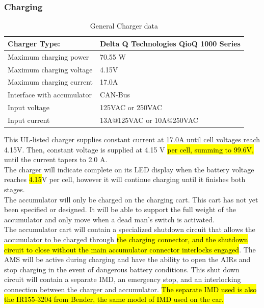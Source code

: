 \documentclass{article}
\DeclareRobustCommand{\hlr}[1]{{\sethlcolor{red}\hl{#1}}}
\begin{document}
        \subsubsection{Charging} \label{charging}


            \begin{table}[H]
            \centering
            \begin{tabular}{|l|l|}
            \hline
            Charger Type: & Delta Q Technologies QioQ 1000 Series \\ \hline
            Maximum charging power & 70.55 W \\ \hline
            Maximum charging voltage & 4.15V \\ \hline
            Maximum charging current & 17.0A \\ \hline
            Interface with accumulator & CAN-Bus \\ \hline
            Input voltage & 125VAC or 250VAC \\ \hline
            Input current & 13A@125VAC or 10A@250VAC \\ \hline
            \end{tabular}
            \caption{General Charger data}
            \label{charger}
            \end{table}

            This UL-listed charger supplies constant current at 17.0A until cell voltages reach 4.15V. Then, constant voltage is supplied at 4.15 V \hlr{per cell, summing to 99.6V,} until the current tapers to 2.0 A.\\

            The charger will indicate complete on its LED display when the battery voltage reaches \hlr{4.15}V per cell, however it will continue charging until it finishes both stages.\\

            The accumulator will only be charged on the charging cart. This cart has not yet been specified or designed. It will be able to support the full weight of the accumulator and only move when a dead man's switch is activated.\\

            The accumulator cart will contain a specialized shutdown circuit that allows the accumulator to be charged through \hlr{the charging connector, and the shutdown circuit to close without the main accumulator connector interlocks engaged}. The AMS will be active during charging and have the ability to open the AIRs and stop charging in the event of dangerous battery conditions. This shut down circuit will contain a separate IMD, an emergency stop, and an interlocking connection between the charger and accumulator. \hlr{ The separate IMD used is also the IR155-3204 from Bender, the same model of IMD used on the car.}
\end{document}
